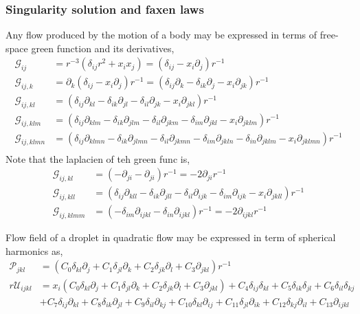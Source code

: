 \subsubsection{Singularity solution and faxen laws}
Any flow produced by the motion of a body may be expressed in terms of free-space green function and its derivatives,
\begin{align}
    \mathcal{G}_{ij}
    &=
    r^{-3}(\delta_{ij} r^2 + x_ix_j)
    =
    (\delta_{ij} - x_i \partial_j )r^{-1}\\
    \mathcal{G}_{ij,k}
    &=
    \partial_k (\delta_{ij} - x_i \partial_j )r^{-1}
    =(\delta_{ij}\partial_k  
    - \delta_{ik} \partial_j  
    - x_i \partial_{jk} )r^{-1}\\
    \mathcal{G}_{ij,kl}
    &=(
        \delta_{ij} \partial_{kl} 
    - \delta_{ik} \partial_{jl}  
    - \delta_{il} \partial_{jk}
    - x_i \partial_{jkl}
    )r^{-1}\\
    \mathcal{G}_{ij,klm}
    &=(
        \delta_{ij} \partial_{klm} 
    - \delta_{ik} \partial_{jlm}  
    - \delta_{il} \partial_{jkm}
    - \delta_{im} \partial_{jkl}
    - x_i \partial_{jklm}
    )r^{-1}\\
    \mathcal{G}_{ij,klmn}
    &=(
    \delta_{ij} \partial_{klmn} 
    - \delta_{ik} \partial_{jlmn}  
    - \delta_{il} \partial_{jkmn}
    - \delta_{im} \partial_{jkln}
    - \delta_{in} \partial_{jklm}
    - x_i \partial_{jklmn}
    )r^{-1}\\
\end{align}
Note that the laplacien of teh green func is, 
\begin{align}
    \mathcal{G}_{ij,kl}
    &=(
    -  \partial_{ji}  
    - \partial_{ji}
    )r^{-1}
    = -2 \partial_{ji}r^{-1}\\
    \mathcal{G}_{ij,kll}
    &=(
        \delta_{ij} \partial_{kll} 
    - \delta_{ik} \partial_{jll}  
    - \delta_{il} \partial_{ijk}
    - \delta_{im} \partial_{ijk}
    - x_i \partial_{jkll}
    )r^{-1}\\
    \mathcal{G}_{ij,klmm}
    &=(
    - \delta_{im} \partial_{ijkl}
    - \delta_{in} \partial_{ijkl}
    )r^{-1}
    = -2 \partial_{ijkl}r^{-1}
\end{align}

Flow field of a droplet in quadratic flow may be expressed in term of spherical harmonics as, 
\begin{align}
    \mathcal{P}_{jkl}
    &=
    (C_0 \delta_{kl}\partial_j
    + C_1 \delta_{jl}\partial_k
    + C_2 \delta_{jk}\partial_l
    + C_3 \partial_{jkl})r^{-1}\\
    r \mathcal{U}_{ijkl}
    &=
    x_i 
    (C_0 \delta_{kl}\partial_j
    + C_1 \delta_{jl}\partial_k
    + C_2 \delta_{jk}\partial_l
    + C_3 \partial_{jkl})
    + C_4\delta_{ij}\delta_{kl}
    + C_5\delta_{ik}\delta_{jl}
    + C_6\delta_{il}\delta_{kj}\\
    &
    + C_7\delta_{ij}\partial_{kl}
    + C_8\delta_{ik}\partial_{jl}
    + C_9\delta_{il}\partial_{kj}
    + C_{10}\delta_{kl}\partial_{ij}
    + C_{11}\delta_{jl}\partial_{ik}
    + C_{12}\delta_{kj}\partial_{il}
    + C_{13}\partial_{ijkl}
\end{align}


